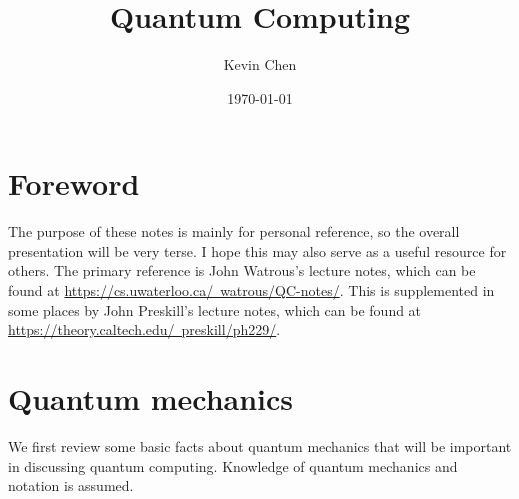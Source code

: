 \documentclass{article}
\title{Quantum Computing}
\author{Kevin Chen}
\date{\today}
\numberwithin{equation}{section} 		%
\begin{document}
\maketitle

\tableofcontents

\newpage
\section*{Foreword}
The purpose of these notes is mainly for personal reference, so the overall presentation will be very terse.
I hope this may also serve as a useful resource for others.
The primary reference is John Watrous's lecture notes, which can be found at \href{https://cs.uwaterloo.ca/~watrous/QC-notes/}{https://cs.uwaterloo.ca/~watrous/QC-notes/}.
This is supplemented in some places by John Preskill's lecture notes, which can be found at \href{http://theory.caltech.edu/~preskill/ph229/}{https://theory.caltech.edu/~preskill/ph229/}.

\newpage

\section{Quantum mechanics} %
\label{sec-qm} %

We first review some basic facts about quantum mechanics that will be important in discussing quantum computing.
Knowledge of quantum mechanics and notation is assumed.
\end{document}

